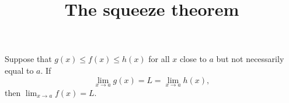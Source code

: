 \documentclass{ximera}
\title[Dig-In]{The squeeze theorem}
\begin{document}
\begin{abstract}
\end{abstract}
\maketitle



\begin{theorem}
Suppose that $g(x) \le f(x) \le h(x)$ for all $x$
close to $a$ but not necessarily equal to $a$. If 
\[
\lim_{x\to a} g(x) = L = \lim_{x\to a} h(x),
\] 
then $\lim_{x\to a} f(x) = L$.
\end{theorem}

\begin{question}
\end{question}
\end{document}
